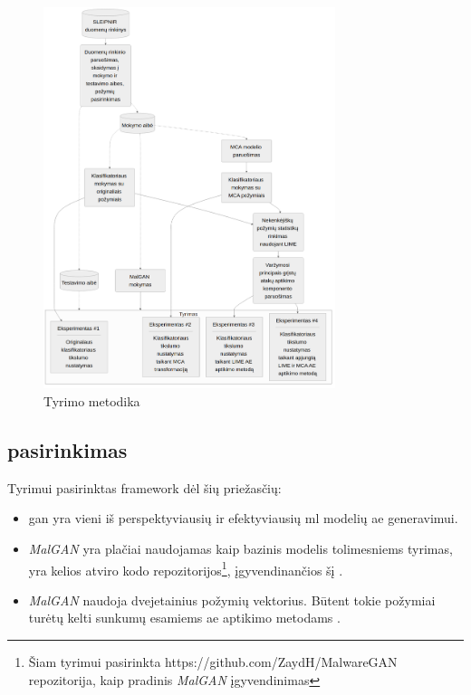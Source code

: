 \begin{figure}[h]
    \centering
    \includegraphics[width=0.76\textwidth]{images/methodology.png}
    \caption{Tyrimo metodika}
    \label{fig:methodology}
\end{figure}

\subsection{  pasirinkimas}\label{sec:method:malgan}

Tyrimui pasirinktas  \gls{framework} dėl šių priežasčių:
\begin{itemize}
    \item \gls{gan} yra vieni iš perspektyviausių ir efektyviausių \gls{ml} modelių \gls{ae} generavimui.
    \item \textit{MalGAN} yra plačiai naudojamas kaip bazinis modelis tolimesniems tyrimas, yra kelios atviro kodo repozitorijos\footnote{Šiam tyrimui pasirinkta https://github.com/ZaydH/MalwareGAN repozitorija, kaip pradinis \textit{MalGAN} įgyvendinimas}, įgyvendinančios šį .
    \item \textit{MalGAN} naudoja dvejetainius požymių vektorius. Būtent tokie požymiai turėtų kelti sunkumų esamiems \gls{ae} aptikimo metodams .
\end{itemize}

